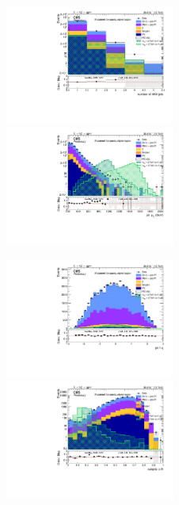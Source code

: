 \begin{figure}[!htb]
  \begin{center}
    \includegraphics[width=0.495\textwidth]{plots/v9_U/XVZnnlpSR/nFatJets.pdf}  
    \includegraphics[width=0.495\textwidth]{plots/v9_U/XVZnnlpSR/FatJet1_pt.pdf}
    
    \includegraphics[width=0.495\textwidth]{plots/v9_U/XVZnnlpSR/FatJet1_eta.pdf}
    \includegraphics[width=0.495\textwidth]{plots/v9_U/XVZnnlpSR/FatJet1_dR.pdf}


\end{center}
\end{figure}
